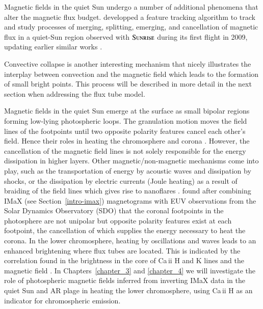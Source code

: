 \documentclass[goettingen, gauss, print]{thesis}
\begin{document}
Magnetic fields in the quiet Sun undergo a number of additional phenomena that alter the magnetic flux budget. \cite{anusha_statistical_2017} developped a feature tracking algorithm to track and study processes of merging, splitting, emerging, and cancellation of magnetic flux in a quiet-Sun region observed with $\textsc{Sunrise}$ during its first flight in 2009, updating earlier similar works \citep[e.g.,][]{deforest_solar_2007, zhou_solar_2010, lamb_solar_2013}.
 
Convective collapse is another interesting mechanism that nicely illustrates the interplay between convection and the magnetic field which leads to the formation of small bright points. This process will be described in more detail in the next section when addressing the flux tube model.

Magnetic fields in the quiet Sun emerge at the surface as small bipolar regions forming low-lying photospheric loops. The granulation motion moves the field lines of the footpoints until two opposite polarity features cancel each other's field. Hence their roles in heating the chromosphere and corona \citep[]{zhang_lifetime_1998, kubo_magnetic_2007,ishikawa_comparison_2009,zhou_solar_2010,gosic_chromospheric_2018}. However, the cancellation of the magnetic field lines is not solely responsible for the energy dissipation in higher layers. Other magnetic/non-magnetic mechanisms come into play, such as the transportation of energy by acoustic waves and dissipation by shocks, or the dissipation by electric currents (Joule heating) as a result of braiding of the field lines which gives rise to nanoflares \citep{parker_nanoflares_1988}. \cite{chitta_solar_2017} found after combining IMaX (see Section~\ref{intro-imax}) magnetograms with EUV observations from the Solar Dynamics Observatory (SDO) that the coronal footpoints in the photosphere are not unipolar but opposite polarity features exist at each footpoint, the cancellation of which supplies the energy necessary to heat the corona.
In the lower chromosphere, heating by oscillations and waves leads to an enhanced brightening where flux tubes are located. This is indicated by the correlation found in the brightness in the core of Ca\,{\sc ii} H and K lines and the magnetic field \citep[]{skumanich_statistical_1975,schrijver_relations_1989,ortiz_how_2005,rezaei_relation_2007,loukitcheva_relationship_2009,kahil_brightness_2017}.
In Chapters~\ref{chapter_3} and \ref{chapter_4} we will investigate the role of photospheric magnetic fields inferred from inverting IMaX data in the quiet Sun and AR plage in heating the lower chromosphere, using Ca\,{\sc ii} H as an indicator for chromospheric emission.\\
\end{document}

